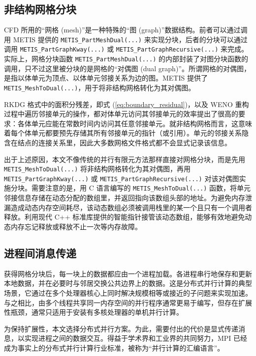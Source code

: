

\subsection{非结构网格分块}

CFD 所用的“网格 (mesh)”是一种特殊的“图 (graph)”数据结构。前者可以通过调用
METIS 提供的 \texttt{METIS\_PartMeshDual(...)} 来实现分块，后者的分块可以通过调用
\texttt{METIS\_PartGraphKway(...)} 或 \texttt{METIS\_PartGraphRecursive(...)}
来完成。实际上，网格分块函数 \texttt{METIS\_PartMeshDual(...)} 的内部封装了对图分块函数的调用，只不过这里被分块的是网格的“对偶图
(dual graph)”。所谓网格的对偶图，是指以体单元为顶点、以体单元邻接关系为边的图。METIS 提供了 \texttt{METIS\_MeshToDual(...)}，用于将非结构网格转化为其对偶图。

RKDG 格式中的面积分残差，即式 (\ref{eq:boundary_residual})，以及 WENO 重构过程中遍历邻接单元的操作，都对体单元访问其邻接单元的效率提出了很高的要求：各体单元应能在常数时间内访问其任意邻接单元。就非结构网格而言，这意味着每个体单元都要预先存储其所有邻接单元的指针（或引用）。单元的邻接关系隐含在结点的连接关系里，因此大多数网格文件格式都不会显式记录该信息。

出于上述原因，本文不像传统的并行有限元方法那样直接对网格分块，而是先用 \texttt{METIS\_MeshToDual(...)}
将非结构网格转化为其对偶图，再用 \texttt{METIS\_PartGraphKway(...)} 或 \texttt{METIS\_PartGraphRecursive(...)}
对该对偶图实施分块。需要注意的是，用 C 语言编写的 \texttt{METIS\_MeshToDual(...)} 函数，将单元邻接信息存储在动态分配的数组里，并返回指向该数组头部的地址。为避免内存泄漏造成动态内存空间耗尽，该动态数组必须被调用栈里的某一个且只有一个调用者释放。利用现代
C++ 标准库提供的智能指针接管该动态数组，能够有效地避免动态内存忘记释放或释放不止一次等内存故障。

\subsection{进程间消息传递}

获得网格分块后，每一块上的数据都应由一个进程加载。各进程串行地保存和更新本地数据，并在必要时与邻居交换公共边界上的数据。这是分布式并行计算的典型场景，它通过在多个处理器核心上同时解决规模相等或接近的子问题来实现加速。与之相比，由多个线程共享同一内存空间的并行程序通常更易于编写，但存在扩展性瓶颈，通常只适用于安装有多核处理器的单机并行计算。

为保持扩展性，本文选择分布式并行方案。为此，需要付出的代价是显式传递消息，以实现进程之间的数据交互。得益于学术界和工业界的共同努力，MPI
已经成为事实上的分布式并行计算行业标准，被称为“并行计算的汇编语言”。

